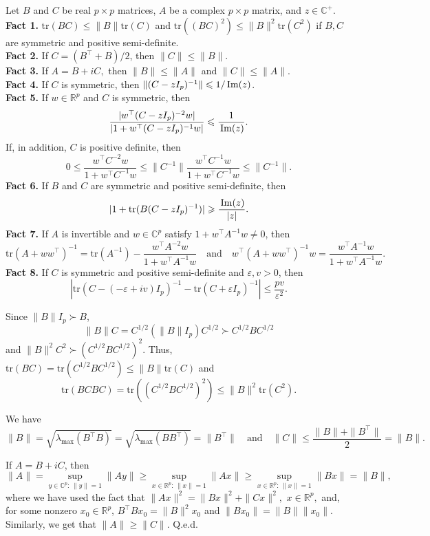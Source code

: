 \documentclass[12pt, a4paper]{article}
\renewcommand\Im{{\rm\,Im} }
\newcommand\bR{{\mathbb R}}
\newcommand\tr{{\mathrm{tr}}}
\begin{document}
 Let $B$ and $C$ be  real $p\times p$ matrices, $A$ be a complex $p\times p$ matrix, and  $z\in \mathbb C^+$.  
 \\ 
{\bf Fact 1.} $\tr(BC)\leqslant \|B\|\tr(C)$ and $\tr((BC)^2)\leqslant \|B\|^2\tr(C^2)$ if $B,C$ are symmetric and positive semi-definite.
\\
{\bf Fact 2.} If $C=(B^\top+B)/2$, then $\|C\|\leqslant \|B\|$.
\\
{\bf Fact 3.} If $A=B+iC,$ then $\|B\|\leqslant \|A\|$ and $\|C\|\leqslant \|A\|.$
\\ 
{\bf Fact 4.}  If $C$ is symmetric, then $\|(C-zI_p)^{-1}\|\leqslant 1/\Im(z) $.
\\
{\bf Fact 5.}   If  $w\in\bR^p$ and  $C$ is symmetric, then
\[ \frac{|w^\top (C-zI_p)^{-2}  w|}{|1+w^\top (C-zI_p)^{-1} w|}\leqslant \frac{1}{\Im(z)}.\]
If, in addition, $C$ is positive definite, then 
\[0\leqslant \frac{w^\top C^{-2}  w}{1+w^\top C^{-1} w}\leqslant \|C^{-1}\| \frac{w^\top C^{-1}  w}{1+w^\top C^{-1} w}\leqslant \|C^{-1}\|.\]
{\bf Fact 6.} If $B$ and $C$ are symmetric and positive semi-definite, then
\[|1+\tr(B(C-zI_p)^{-1})|\geqslant \frac{\Im(z)}{|z|}.\]
{\bf Fact 7.} If $A$ is invertible and $w\in\mathbb C^p$ satisfy $1+w^\top A^{-1}w\neq 0$, then
\[\tr(A+ww^\top )^{-1}=\tr (A^{-1})-\frac{ w^\top A^{-2}w}{1+ w^\top A^{-1}w}\quad\text{and}\quad  w^\top (A+ww^\top)^{-1}w=\frac{ w^\top A^{-1}w}{1+ w^\top A^{-1}w}.\] 
{\bf Fact 8.} If $C$ is symmetric and positive semi-definite and $\varepsilon,v>0$,  then
\[|\tr(C-(-\varepsilon+iv)I_p)^{-1}-\tr(C+\varepsilon I_p)^{-1}|\leqslant \frac{pv}{\varepsilon^2}.\] 

  Since $\|B\|I_p\succ B$,   \[\|B\|C=C^{1/2}(\|B\|I_p)C^{1/2}\succ C^{1/2}BC^{1/2}\]
and $\|B\|^2C^2\succ (C^{1/2}BC^{1/2})^2$. Thus, $\tr(BC)=\tr(C^{1/2}BC^{1/2})\leqslant \|B\|\tr(C)$ and \[\tr(BCBC)=\tr((C^{1/2}BC^{1/2})^2)\leqslant \|B\|^2\tr(C^2).\]  

 We have  \[
\|B\|=\sqrt{\lambda_{\max}(B^\top B)}=\sqrt{\lambda_{\max}(BB^\top)}=\|B^\top\|\quad\text{and}\quad\|C\|\leqslant\frac{\|B\|+\|B^\top\|}{2}=\|B\|.\]

 If $A=B+iC$, then \[
\|A\|=\sup_{y\in\mathbb C^p:\,\|y\|=1}\|Ay\|\geqslant \sup_{x\in\mathbb R^p:\,\|x\|=1}\|Ax\|\geqslant
\sup_{x\in\mathbb R^p:\,\|x\|=1}\|Bx\|=\|B\|, \]
where we have used the fact that $\|Ax\|^2=\|Bx\|^2+\|Cx\|^2,$ $x\in\bR^p,$ and, for some nonzero $x_0\in\bR^p$, 
 $B^\top Bx_0=\|B\|^2x_0$ and $\|Bx_0\|=\|B\|\|x_0\|$. Similarly, we get that $\|A\|\geqslant \|C\|$. Q.e.d.
\end{document}
